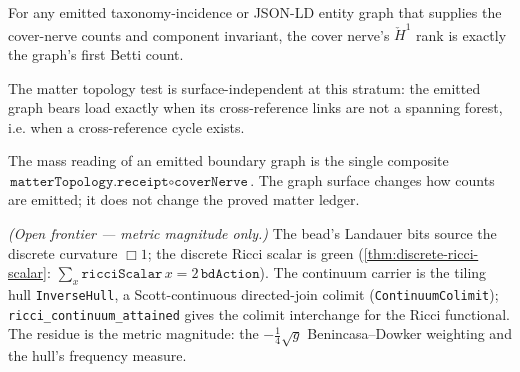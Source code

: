 \begin{theorem}\label{thm:boundary-link-h1-first-betti}\leanok{}
For any emitted taxonomy-incidence or JSON-LD entity graph that supplies the
cover-nerve counts and component invariant, the cover nerve's
\(\check H^1\) rank is exactly the graph's first Betti count.
\end{theorem}

\begin{theorem}\label{thm:boundary-link-load-bearing-cycle}\leanok{}
The matter topology test is surface-independent at this stratum: the emitted
graph bears load exactly when its cross-reference links are not a spanning
forest, i.e. when a cross-reference cycle exists.
\end{theorem}

\begin{theorem}\label{thm:boundary-link-mass-factor}\leanok{}
The mass reading of an emitted boundary graph is the single composite
\(\texttt{matterTopology.receipt} \circ \texttt{coverNerve}\).  The graph
surface changes how counts are emitted; it does not change the proved matter
ledger.
\end{theorem}

\begin{theorem}\label{thm:bead-ricci}\notready{}
\emph{(Open frontier --- metric magnitude only.)} The bead's Landauer bits source
the discrete curvature $\Box 1$; the discrete Ricci scalar is green
(\cref{thm:discrete-ricci-scalar}: $\sum_x\mathtt{ricciScalar}\,x =
2\,\mathtt{bdAction}$).  The continuum carrier is the tiling hull
\texttt{InverseHull}, a Scott-continuous directed-join colimit
(\texttt{ContinuumColimit}); \texttt{ricci\_continuum\_attained} gives the
colimit interchange for the Ricci functional.  The residue is the metric
magnitude: the $-\tfrac14\sqrt g$ Benincasa--Dowker weighting and the hull's
frequency measure.
\end{theorem}

